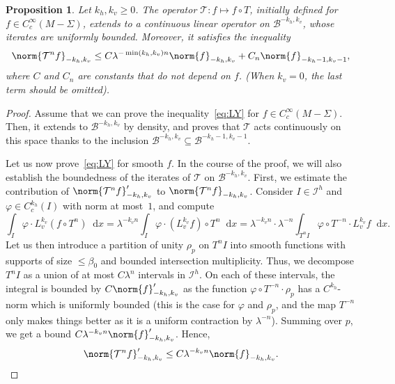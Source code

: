 \documentclass[JEP,XML,SOM,Unicode]{cedram}
\newcommand{\boI}{\mathcal{I}}
\newcommand{\boB}{\mathcal{B}}
\newcommand{\boT}{\mathcal{T}}
\newcommand{\dd}{\mathop{}\!\mathrm{d}}
\let\phi\varphi
\newtheorem{prop}[thm]{Proposition}
\theoremstyle{definition}
\numberwithin{equation}{section}
\begin{document}
\begin{prop}
\label{prop:LY} Let $k_h, k_v \geq 0$. The operator $\boT : f \mapsto f \circ
T$, initially defined for $f \in C^\infty_c(M-\Sigma)$, extends to a
continuous linear operator on $\boB^{-k_h, k_v}$, whose iterates are
uniformly bounded. Moreover, it satisfies the inequality
\begin{equation}
\label{eq:LY}
\norm{\boT^n f}_{-k_h, k_v} \leq C \lambda^{-\min(k_h, k_v) n} \norm{f}_{-k_h, k_v} + C_n \norm{f}_{-k_h-1, k_v-1},
\end{equation}
where $C$ and $C_n$ are constants that do not depend on $f$. (When $k_v=0$,
the last term should be omitted).
\end{prop}
\begin{proof}
Assume that we can prove the inequality~\eqref{eq:LY} for $f \in
C^\infty_c(M-\Sigma)$. Then, it extends to $\boB^{-k_h, k_v}$ by density, and
proves that $\boT$ acts continuously on this space thanks to the inclusion
$\boB^{-k_h, k_v} \subseteq \boB^{-k_h-1, k_v-1}$.

Let us now prove~\eqref{eq:LY} for smooth $f$. In the course of the proof, we
will also establish the boundedness of the iterates of $\boT$ on $\boB^{-k_h,
k_v}$. First, we estimate the contribution of $\norm{\boT^n f}'_{-k_h, k_v}$
to $\norm{\boT^n f}_{-k_h, k_v}$. Consider $I \in \boI^h$ and $\phi \in
C^{k_h}_c(I)$ with norm at most~$1$, and compute
\begin{equation*}
\int_I \!\phi \cdot L_v^{k_v}(f \circ T^n) \dd x
= \lambda^{-k_v n} \int_I \!\phi \cdot (L_v^{k_v} f) \circ T^n \dd x
= \lambda^{-k_v n} \cdot \lambda^{-n} \int_{T^n I}\!\phi \circ T^{-n} \cdot L_v^{k_v}f \dd x.
\end{equation*}
Let us then introduce a partition of unity $\rho_p$ on $T^n I$ into smooth
functions with supports of size $\leq \beta_0$ and bounded intersection
multiplicity. Thus, we decompose $T^n I$ as a union of at most $C \lambda^n$
intervals in $\boI^h$. On each of these intervals, the integral is bounded by
$C \norm{f}'_{-k_h, k_v}$ as the function $\phi \circ T^{-n} \cdot \rho_p$
has a $C^{k_h}$-norm which is uniformly bounded (this is the case for $\phi$
and $\rho_p$, and the map $T^{-n}$ only makes things better as it is a
uniform contraction by $\lambda^{-n}$). Summing over $p$, we get a bound $C
\lambda^{-k_v n} \norm{f}'_{-k_h, k_v}$. Hence,
\begin{equation}
\label{eq:ksprime}
\norm{\boT^n f}'_{-k_h, k_v} \leq C \lambda^{-k_v n} \norm{f}_{-k_h, k_v}.
\end{equation}


\end{proof}
\end{document}
